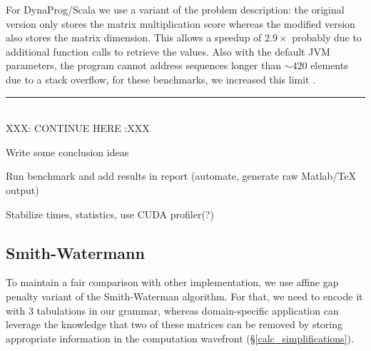 For DynaProg/Scala we use a variant of the problem description: the original version only stores the matrix multiplication score whereas the modified version also stores the matrix dimension. This allows a speedup of $2.9\times$ probably due to additional function calls to retrieve the values. Also with the default JVM parameters, the program cannot address sequences longer than $\sim 420$ elements due to a stack overflow, for these benchmarks, we increased this limit	.

{\center\color{red} \noindent\rule{16cm}{0.4pt} \\ XXX: CONTINUE HERE :XXX \\}

{\color{red}\ol
\item Write some conclusion ideas
\item Run benchmark and add results in report (automate, generate raw Matlab/TeX output)
\item Stabilize times, statistics, use CUDA profiler(?)
\ole}

\subsection{Smith-Watermann}
To maintain a fair comparison with other implementation, we use affine gap penalty variant of the Smith-Waterman algorithm. For that, we need to encode it with 3 tabulations in our grammar, whereas domain-specific application can leverage the knowledge that two of these matrices can be removed by storing appropriate information in the computation wavefront (\S\ref{calc_simplifications}).

